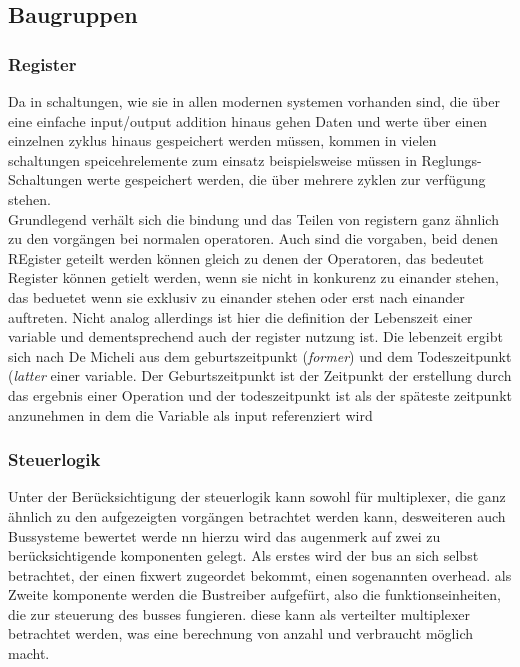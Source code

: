 \documentclass[conference]{IEEEtran}
\begin{document}
\subsection{Baugruppen}
 \subsubsection{Register}
 Da in schaltungen, wie sie in allen modernen systemen vorhanden sind, die über eine einfache input/output addition hinaus gehen Daten und werte über einen einzelnen zyklus hinaus gespeichert werden müssen, kommen in vielen schaltungen speicehrelemente zum einsatz beispielsweise müssen in Reglungs-Schaltungen werte gespeichert werden, die über mehrere zyklen zur verfügung stehen. \\
 Grundlegend verhält sich die bindung und das Teilen von registern ganz ähnlich zu den vorgängen bei normalen operatoren. Auch sind die vorgaben, beid denen REgister geteilt werden können gleich zu denen der Operatoren, das bedeutet Register können getielt werden, wenn sie nicht in konkurenz zu einander stehen, das beduetet wenn sie exklusiv zu einander stehen oder erst nach  einander auftreten. Nicht analog allerdings ist hier die definition der Lebenszeit einer variable und dementsprechend auch der register nutzung ist. Die lebenzeit ergibt sich nach De Micheli aus dem geburtszeitpunkt (\textit{former})  und dem Todeszeitpunkt (\textit{latter} einer variable. Der Geburtszeitpunkt ist der Zeitpunkt der erstellung durch das ergebnis einer Operation und der todeszeitpunkt ist als der späteste zeitpunkt anzunehmen in dem die Variable als input referenziert wird\cite[S. 240]{3}
 \subsubsection{Steuerlogik}
 Unter der Berücksichtigung der steuerlogik kann sowohl für multiplexer, die ganz ähnlich zu den aufgezeigten vorgängen betrachtet werden kann, desweiteren auch Bussysteme bewertet werde nn hierzu wird das augenmerk auf zwei zu berücksichtigende komponenten gelegt. Als erstes wird der bus an sich selbst betrachtet, der einen fixwert zugeordet bekommt, einen sogenannten overhead.
 als Zweite komponente werden die Bustreiber aufgefürt, also die funktionseinheiten, die zur steuerung des busses fungieren. diese kann als verteilter multiplexer betrachtet werden, was eine berechnung von anzahl und verbraucht möglich macht.\cite[S. 157]{3}
\end{document}
